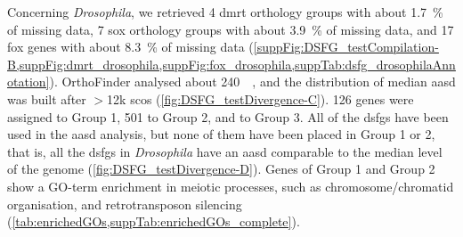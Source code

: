 Concerning \textit{Drosophila}, we retrieved 4 \gls{dmrt} orthology groups with about \qty{1.7}{\percent} of missing data, 7 \gls{sox} orthology groups with about \qty{3.9}{\percent} of missing data, and 17 \gls{fox} genes with about \qty{8.3}{\percent} of missing data (\cref{suppFig:DSFG_testCompilation-B,suppFig:dmrt_drosophila,suppFig:fox_drosophila,suppTab:dsfg_drosophilaAnnotation}). OrthoFinder analysed about \qty{240}{\mega\nothing}, and the distribution of median \gls{aasd} was built after $>$12k \glspl{sco} (\cref{fig:DSFG_testDivergence-C}). \num{126} genes were assigned to Group 1, \num{501} to Group 2, and  to Group 3. All of the \glspl{dsfg} have been used in the \gls{aasd} analysis, but none of them have been placed in Group 1 or 2, that is, all the \glspl{dsfg} in \textit{Drosophila} have an \gls{aasd} comparable to the median level of the genome (\cref{fig:DSFG_testDivergence-D}). Genes of Group 1 and Group 2 show a GO-term enrichment in meiotic processes, such as chromosome/chromatid organisation, and retrotransposon silencing (\cref{tab:enrichedGOs,suppTab:enrichedGOs_complete}).

